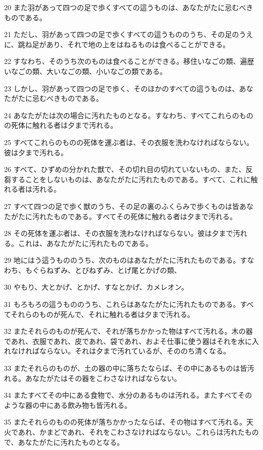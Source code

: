 \par 20 また羽があって四つの足で歩くすべての這うものは、あなたがたに忌むべきものである。
\par 21 ただし、羽があって四つの足で歩くすべての這うもののうち、その足のうえに、跳ね足があり、それで地の上をはねるものは食べることができる。
\par 22 すなわち、そのうち次のものは食べることができる。移住いなごの類、遍歴いなごの類、大いなごの類、小いなごの類である。
\par 23 しかし、羽があって四つの足で歩く、そのほかのすべての這うものは、あなたがたに忌むべきものである。
\par 24 あなたがたは次の場合に汚れたものとなる。すなわち、すべてこれらのものの死体に触れる者は夕まで汚れる。
\par 25 すべてこれらのものの死体を運ぶ者は、その衣服を洗わなければならない。彼は夕まで汚れる。
\par 26 すべて、ひずめの分かれた獣で、その切れ目の切れていないもの、また、反芻することをしないものは、あなたがたに汚れたものである。すべて、これに触れる者は汚れる。
\par 27 すべて四つの足で歩く獣のうち、その足の裏のふくらみで歩くものは皆あなたがたに汚れたものである。すべてその死体に触れる者は夕まで汚れる。
\par 28 その死体を運ぶ者は、その衣服を洗わなければならない。彼は夕まで汚れる。これは、あなたがたに汚れたものである。
\par 29 地にはう這うもののうち、次のものはあなたがたに汚れたものである。すなわち、もぐらねずみ、とびねずみ、とげ尾とかげの類、
\par 30 やもり、大とかげ、とかげ、すなとかげ、カメレオン。
\par 31 もろもろの這うもののうち、これらはあなたがたに汚れたものである。すべてそれらのものが死んで、それに触れる者は夕まで汚れる。
\par 32 またそれらのものが死んで、それが落ちかかった物はすべて汚れる。木の器であれ、衣服であれ、皮であれ、袋であれ、およそ仕事に使う器はそれを水に入れなければならない。それは夕まで汚れているが、そののち清くなる。
\par 33 またそれらのものが、土の器の中に落ちたならば、その中にあるものは皆汚れる。あなたがたはその器をこわさなければならない。
\par 34 またすべてその中にある食物で、水分のあるものは汚れる。またすべてそのような器の中にある飲み物も皆汚れる。
\par 35 またそれらのものの死体が落ちかかったならば、その物はすべて汚れる。天火であれ、かまどであれ、それをこわさなければならない。これらは汚れたもので、あなたがたに汚れたものとなる。
